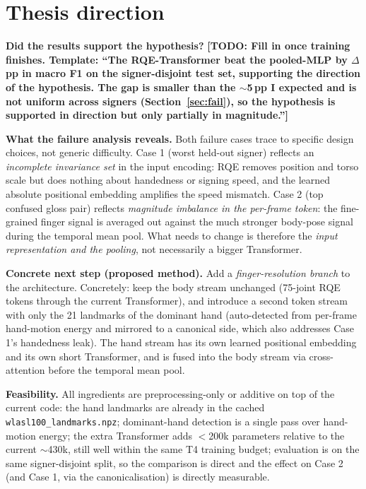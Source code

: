 \documentclass[11pt,a4paper]{article}
\newcommand{\todo}[1]{{\color{red}\textbf{[TODO: #1]}}}
\begin{document}
\section{Thesis direction}

\textbf{Did the results support the hypothesis?}
\todo{Fill in once training finishes. Template: ``The RQE-Transformer beat the pooled-MLP by $\Delta$\,pp in macro F1 on the signer-disjoint test set, supporting the direction of the hypothesis. The gap is smaller than the $\sim$5\,pp I expected and is not uniform across signers (Section~\ref{sec:fail}), so the hypothesis is supported in direction but only partially in magnitude.''}

\textbf{What the failure analysis reveals.} Both failure cases trace to specific design choices, not generic difficulty. Case 1 (worst held-out signer) reflects an \emph{incomplete invariance set} in the input encoding: RQE removes position and torso scale but does nothing about handedness or signing speed, and the learned absolute positional embedding amplifies the speed mismatch. Case 2 (top confused gloss pair) reflects \emph{magnitude imbalance in the per-frame token}: the fine-grained finger signal is averaged out against the much stronger body-pose signal during the temporal mean pool. What needs to change is therefore the \emph{input representation and the pooling}, not necessarily a bigger Transformer.

\textbf{Concrete next step (proposed method).} Add a \emph{finger-resolution branch} to the architecture. Concretely: keep the body stream unchanged (75-joint RQE tokens through the current Transformer), and introduce a second token stream with only the 21 landmarks of the dominant hand (auto-detected from per-frame hand-motion energy and mirrored to a canonical side, which also addresses Case 1's handedness leak). The hand stream has its own learned positional embedding and its own short Transformer, and is fused into the body stream via cross-attention before the temporal mean pool.

\textbf{Feasibility.} All ingredients are preprocessing-only or additive on top of the current code: the hand landmarks are already in the cached \texttt{wlasl100\_landmarks.npz}; dominant-hand detection is a single pass over hand-motion energy; the extra Transformer adds $<$200k parameters relative to the current $\sim$430k, still well within the same T4 training budget; evaluation is on the same signer-disjoint split, so the comparison is direct and the effect on Case 2 (and Case 1, via the canonicalisation) is directly measurable.
\end{document}
